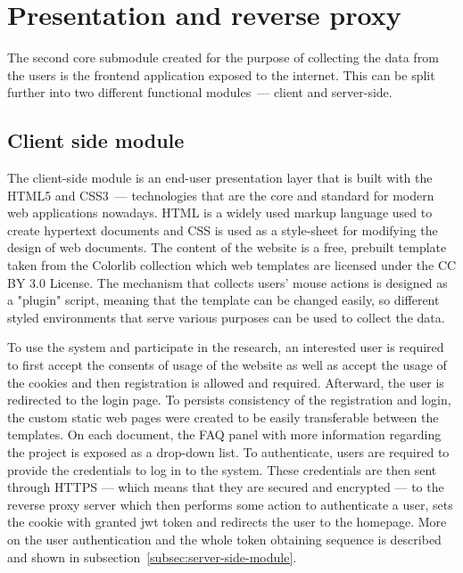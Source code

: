 \section{Presentation and reverse proxy}\label{sec:reverse-proxy}
The second core submodule created for the purpose of collecting the data from the users is the frontend application exposed to the internet.
This can be split further into two different functional modules~--- client and server-side.

\subsection{Client side module}\label{subsec:client-side-module}
The client-side module is an end-user presentation layer that is built with the HTML5 and CSS3~--- technologies that are the core and standard for modern web applications nowadays.
HTML is a widely used markup language used to create hypertext documents and CSS is used as a style-sheet for modifying the design of web documents.
The content of the website is a free, prebuilt template taken from the Colorlib collection which web templates are licensed under the CC BY 3.0 License.
The mechanism that collects users' mouse actions is designed as a "plugin" script, meaning that the template can be changed easily, so different styled environments that serve various purposes can be used to collect the data.

To use the system and participate in the research, an interested user is required to first accept the consents of usage of the website as well as accept the usage of the cookies and then registration is allowed and required. Afterward, the user is redirected to the login page.
To persists consistency of the registration and login, the custom static web pages were created to be easily transferable between the templates.
On each document, the FAQ panel with more information regarding the project is exposed as a drop-down list.
To authenticate, users are required to provide the credentials to log in to the system.
These credentials are then sent through HTTPS --- which means that they are secured and encrypted --- to the reverse proxy server which then performs some action to authenticate a user, sets the cookie with granted \gls{jwt} token and redirects the user to the homepage.
More on the user authentication and the whole token obtaining sequence is described and shown in subsection~\ref{subsec:server-side-module}.

